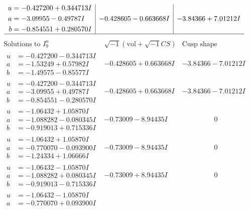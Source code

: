 \documentclass[1p]{elsarticle_modified}
\theoremstyle{definition}
\newcommand{\I}{\sqrt{-1}}
\begin{document}
$$\begin{array}{c|c|c}
\begin{aligned}
u &= -0.427200 + 0.344713 I \\
a &= -3.09955 - 0.49787 I \\
b &= -0.854551 + 0.280570 I\end{aligned}
 & -0.428605 - 0.663668 I & -3.84366 + 7.01212 I\\
 \hline 
 \end{array}$$\newpage$$\begin{array}{c|c|c}  
\text{Solutions to }I^u_{9}& \I (\text{vol} + \sqrt{-1}CS) & \text{Cusp shape}\\
 \hline 
\begin{aligned}
u &= -0.427200 - 0.344713 I \\
a &= -1.53249 + 0.57982 I \\
b &= -1.49575 - 0.85577 I\end{aligned}
 & -0.428605 + 0.663668 I & -3.84366 - 7.01212 I \\ \hline\begin{aligned}
u &= -0.427200 - 0.344713 I \\
a &= -3.09955 + 0.49787 I \\
b &= -0.854551 - 0.280570 I\end{aligned}
 & -0.428605 + 0.663668 I & -3.84366 - 7.01212 I \\ \hline\begin{aligned}
u &= -1.06432 + 1.05870 I \\
a &= -1.088282 - 0.080345 I \\
b &= -0.919013 + 0.715336 I\end{aligned}
 & -0.73009 - 8.94435 I & \phantom{-0.000000 } 0 \\ \hline\begin{aligned}
u &= -1.06432 + 1.05870 I \\
a &= -0.770070 - 0.093900 I \\
b &= -1.24334 + 1.06666 I\end{aligned}
 & -0.73009 - 8.94435 I & \phantom{-0.000000 } 0 \\ \hline\begin{aligned}
u &= -1.06432 - 1.05870 I \\
a &= -1.088282 + 0.080345 I \\
b &= -0.919013 - 0.715336 I\end{aligned}
 & -0.73009 + 8.94435 I & \phantom{-0.000000 } 0 \\ \hline\begin{aligned}
u &= -1.06432 - 1.05870 I \\
a &= -0.770070 + 0.093900 I \\

\end{aligned}
\end{array}$$
\end{document}
